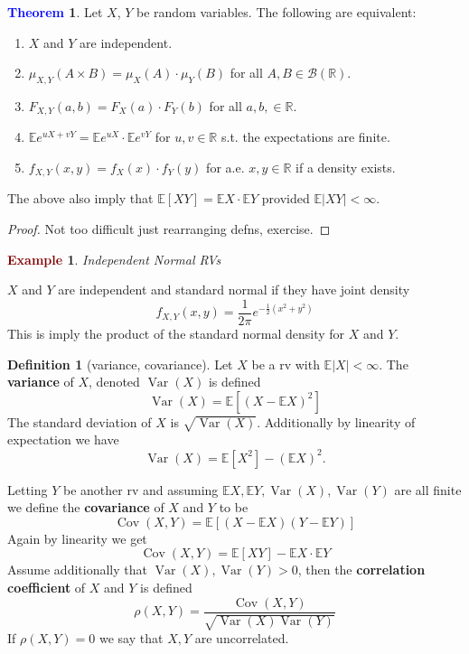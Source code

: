 \documentclass[11pt]{article}
\theoremstyle{definition}
\theoremstyle{definition}
\newcommand{\R}[0]{\mathbb{R}}
\newtheorem{theorem}{\textcolor{blue}{Theorem}}
\theoremstyle{definition}
\newtheorem{definition}{\textcolor{OliveGreen}{Definition}}
\newtheorem{ex}{\textcolor{Maroon}{Example}}
\theoremstyle{remark}
\begin{document}
\begin{theorem}
    Let $X$, $Y$ be random variables. The following are equivalent:
    \begin{enumerate}
        \item $X$ and $Y$ are independent.
        \item $\mu_{X, Y}(A \times B) = \mu_X(A) \cdot \mu_Y(B)$ for all $A, B \in \mathcal{B}(\R)$. 
        \item $F_{X, Y}(a, b) = F_X(a) \cdot F_Y(b)$ for all $a, b, \in \R$.
        \item $\mathbb{E}e^{uX + vY} = \mathbb{E}e^{uX} \cdot \mathbb{E}e^{vY}$ for $u, v \in \R$ s.t. the expectations are finite.
        \item $f_{X, Y}(x, y) = f_X(x) \cdot f_Y(y)$ for a.e. $x, y \in \R$ if a density exists.  
    \end{enumerate}
    The above also imply that $\mathbb{E}[XY] = \mathbb{E}X \cdot \mathbb{E}Y$ provided $\mathbb{E}|XY| < \infty$. 
\end{theorem}
\begin{proof}
    Not too difficult just rearranging defns, exercise.
\end{proof}

\begin{ex}\textit{Independent Normal RVs}

    $X$ and $Y$ are independent and standard normal if they have joint density
    \[
        f_{X, Y}(x, y) = \frac{1}{2 \pi}e^{-\frac{1}{2}(x^2 + y^2)}
    \]    
    This is imply the product of the standard normal density for $X$ and $Y$.  
\end{ex}

\begin{definition}[variance, covariance]
    Let $X$ be a rv with $\mathbb{E} |X| < \infty$. The \textbf{variance} of $X$, denoted $\operatorname{Var}(X)$ is defined
    \[
        \operatorname{Var}(X) = \mathbb{E}[(X - \mathbb{E}X)^2]
    \]    
    The standard deviation of $X$ is $\sqrt{\operatorname{Var}(X)}$. Additionally by linearity of expectation we have
    \[
        \operatorname{Var}(X) = \mathbb{E}[X^2] - (\mathbb{E}X)^2.
    \]   

    Letting $Y$ be another rv and assuming $\mathbb{E} X, \mathbb{E} Y, \operatorname{Var}(X), \operatorname{Var}(Y)$
    are all finite we define the \textbf{covariance} of $X$ and $Y$ to be
    \[
        \operatorname{Cov}(X, Y) = \mathbb{E}[(X - \mathbb{E} X)(Y - \mathbb{E} Y)] 
    \]     
    Again by linearity we get
    \[
        \operatorname{Cov}(X, Y) = \mathbb{E}[XY] - \mathbb{E} X \cdot \mathbb{E} Y
    \] 
    Assume additionally that $\operatorname{Var}(X), \operatorname{Var}(Y) > 0$, then the \textbf{correlation coefficient}
    of $X$ and $Y$ is defined
    \[
        \rho(X, Y) = \frac{\operatorname{Cov}(X, Y)}{\sqrt{\operatorname{Var}(X)\operatorname{Var}(Y)}}
    \]     
    If $\rho(X, Y) = 0$ we say that $X, Y$ are uncorrelated.  
\end{definition}
\end{document}
